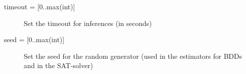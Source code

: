 \documentclass[a4]{article}
\begin{document}
\begin{description}
	\item[{timeout = [0..max(int)]}] Set the timeout for inferences (in seconds)
	\item[{seed = [0..max(int)]}] Set the seed for the random generator (used in the estimators for BDDs and in the SAT-solver)
\end{description}
\end{document}
